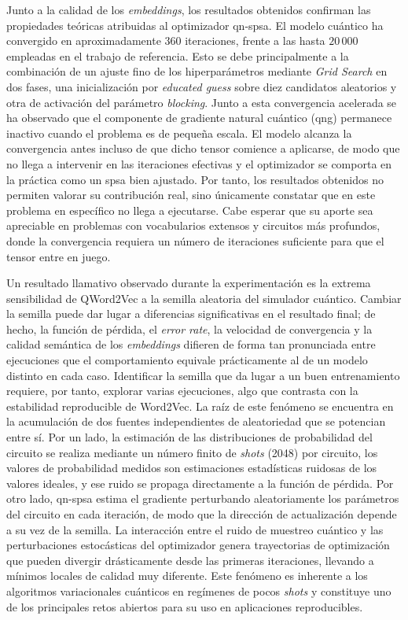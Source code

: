 Junto a la calidad de los \textit{embeddings}, los resultados obtenidos confirman las propiedades teóricas atribuidas al optimizador \gls{qn-spsa}. El modelo cuántico ha convergido en aproximadamente $360$ iteraciones, frente a las hasta $20\,000$ empleadas en el trabajo de referencia. Esto se debe principalmente a la combinación de un ajuste fino de los hiperparámetros mediante \textit{Grid Search} en dos fases, una inicialización por \textit{educated guess} sobre diez candidatos aleatorios y otra de activación del parámetro \textit{blocking}. Junto a esta convergencia acelerada se ha observado que el componente de gradiente natural cuántico (\gls{qng}) permanece inactivo cuando el problema es de pequeña escala. El modelo alcanza la convergencia antes incluso de que dicho tensor comience a aplicarse, de modo que no llega a intervenir en las iteraciones efectivas y el optimizador se comporta en la práctica como un \gls{spsa} bien ajustado. Por tanto, los resultados obtenidos no permiten valorar su contribución real, sino únicamente constatar que en este problema en específico no llega a ejecutarse. Cabe esperar que su aporte sea apreciable en problemas con vocabularios extensos y circuitos más profundos, donde la convergencia requiera un número de iteraciones suficiente para que el tensor entre en juego.

Un resultado llamativo observado durante la experimentación es la extrema sensibilidad de QWord2Vec a la semilla aleatoria del simulador cuántico. Cambiar la semilla puede dar lugar a diferencias significativas en el resultado final; de hecho, la función de pérdida, el \textit{error rate}, la velocidad de convergencia y la calidad semántica de los \textit{embeddings} difieren de forma tan pronunciada entre ejecuciones que el comportamiento equivale prácticamente al de un modelo distinto en cada caso. Identificar la semilla que da lugar a un buen entrenamiento requiere, por tanto, explorar varias ejecuciones, algo que contrasta con la estabilidad reproducible de Word2Vec. La raíz de este fenómeno se encuentra en la acumulación de dos fuentes independientes de aleatoriedad que se potencian entre sí. Por un lado, la estimación de las distribuciones de probabilidad del circuito se realiza mediante un número finito de \textit{shots} (2048) por circuito, los valores de probabilidad medidos son estimaciones estadísticas ruidosas de los valores ideales, y ese ruido se propaga directamente a la función de pérdida. Por otro lado, \gls{qn-spsa} estima el gradiente perturbando aleatoriamente los parámetros del circuito en cada iteración, de modo que la dirección de actualización depende a su vez de la semilla. La interacción entre el ruido de muestreo cuántico y las perturbaciones estocásticas del optimizador genera trayectorias de optimización que pueden divergir drásticamente desde las primeras iteraciones, llevando a mínimos locales de calidad muy diferente. Este fenómeno es inherente a los algoritmos variacionales cuánticos en regímenes de pocos \textit{shots} y constituye uno de los principales retos abiertos para su uso en aplicaciones reproducibles.

